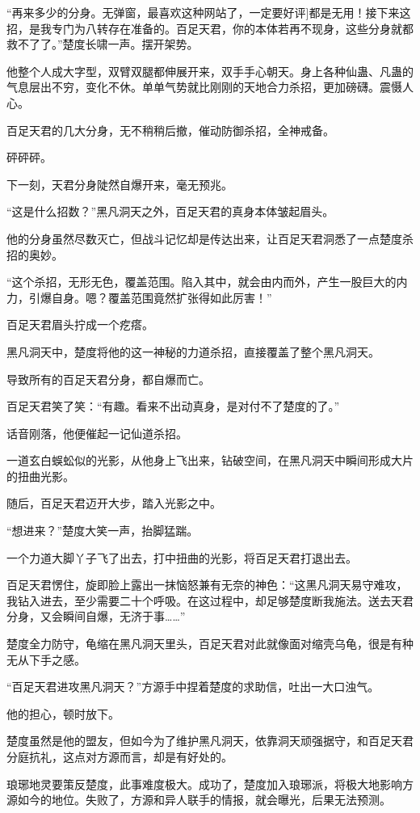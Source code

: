 \begin{this_body}
“再来多少的分身。无弹窗，最喜欢这种网站了，一定要好评]都是无用！接下来这招，是我专门为八转存在准备的。百足天君，你的本体若再不现身，这些分身就都救不了了。”楚度长啸一声。摆开架势。

他整个人成大字型，双臂双腿都伸展开来，双手手心朝天。身上各种仙蛊、凡蛊的气息层出不穷，变化不休。单单气势就比刚刚的天地合力杀招，更加磅礴。震慑人心。

百足天君的几大分身，无不稍稍后撤，催动防御杀招，全神戒备。

砰砰砰。

下一刻，天君分身陡然自爆开来，毫无预兆。

“这是什么招数？”黑凡洞天之外，百足天君的真身本体皱起眉头。

他的分身虽然尽数灭亡，但战斗记忆却是传达出来，让百足天君洞悉了一点楚度杀招的奥妙。

“这个杀招，无形无色，覆盖范围。陷入其中，就会由内而外，产生一股巨大的内力，引爆自身。嗯？覆盖范围竟然扩张得如此厉害！”

百足天君眉头拧成一个疙瘩。

黑凡洞天中，楚度将他的这一神秘的力道杀招，直接覆盖了整个黑凡洞天。

导致所有的百足天君分身，都自爆而亡。

百足天君笑了笑：“有趣。看来不出动真身，是对付不了楚度的了。”

话音刚落，他便催起一记仙道杀招。

一道玄白蜈蚣似的光影，从他身上飞出来，钻破空间，在黑凡洞天中瞬间形成大片的扭曲光影。

随后，百足天君迈开大步，踏入光影之中。

“想进来？”楚度大笑一声，抬脚猛踹。

一个力道大脚丫子飞了出去，打中扭曲的光影，将百足天君打退出去。

百足天君愣住，旋即脸上露出一抹恼怒兼有无奈的神色：“这黑凡洞天易守难攻，我钻入进去，至少需要二十个呼吸。在这过程中，却足够楚度断我施法。送去天君分身，又会瞬间自爆，无济于事……”

楚度全力防守，龟缩在黑凡洞天里头，百足天君对此就像面对缩壳乌龟，很是有种无从下手之感。

“百足天君进攻黑凡洞天？”方源手中捏着楚度的求助信，吐出一大口浊气。

他的担心，顿时放下。

楚度虽然是他的盟友，但如今为了维护黑凡洞天，依靠洞天顽强据守，和百足天君分庭抗礼，这点对方源而言，却是有好处的。

琅琊地灵要策反楚度，此事难度极大。成功了，楚度加入琅琊派，将极大地影响方源如今的地位。失败了，方源和异人联手的情报，就会曝光，后果无法预测。


\end{this_body}
